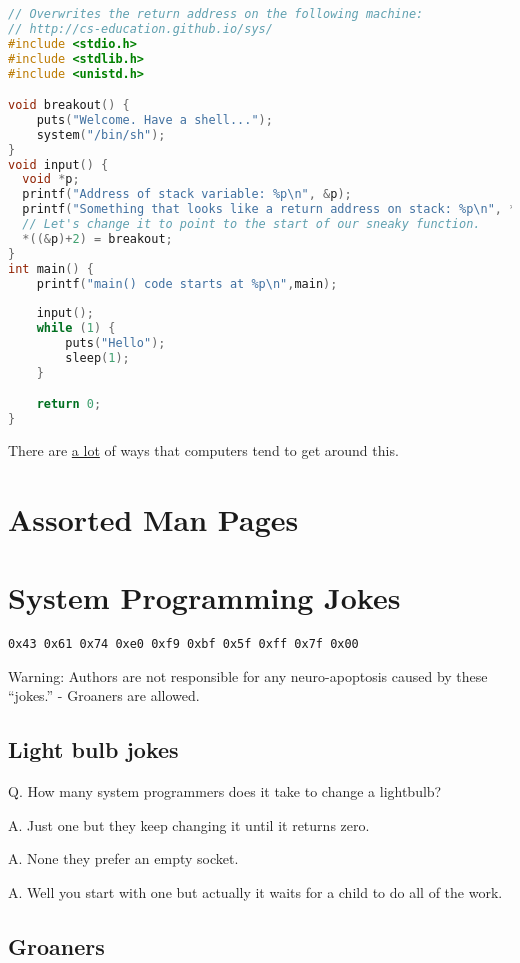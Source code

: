 \begin{lstlisting}[language=C]
// Overwrites the return address on the following machine:
// http://cs-education.github.io/sys/
#include <stdio.h>
#include <stdlib.h>
#include <unistd.h>

void breakout() {
    puts("Welcome. Have a shell...");
    system("/bin/sh");
}
void input() {
  void *p;
  printf("Address of stack variable: %p\n", &p);
  printf("Something that looks like a return address on stack: %p\n", *((&p)+2));
  // Let's change it to point to the start of our sneaky function.
  *((&p)+2) = breakout;
}
int main() {
    printf("main() code starts at %p\n",main);
    
    input();
    while (1) {
        puts("Hello");
        sleep(1);
    }

    return 0;
}
\end{lstlisting}

There are \href{https://en.wikipedia.org/wiki/Stack_buffer_overflow}{a lot} of ways that computers tend to get around this.

\section{Assorted Man Pages}


\section{System Programming Jokes}

\texttt{0x43\ 0x61\ 0x74\ 0xe0\ 0xf9\ 0xbf\ 0x5f\ 0xff\ 0x7f\ 0x00}

Warning: Authors are not responsible for any neuro-apoptosis caused by these ``jokes.'' - Groaners are allowed.

\subsection{Light bulb jokes}

Q. How many system programmers does it take to change a lightbulb?

A. Just one but they keep changing it until it returns zero.

A. None they prefer an empty socket.

A. Well you start with one but actually it waits for a child to do all of the work.

\subsection{Groaners}


